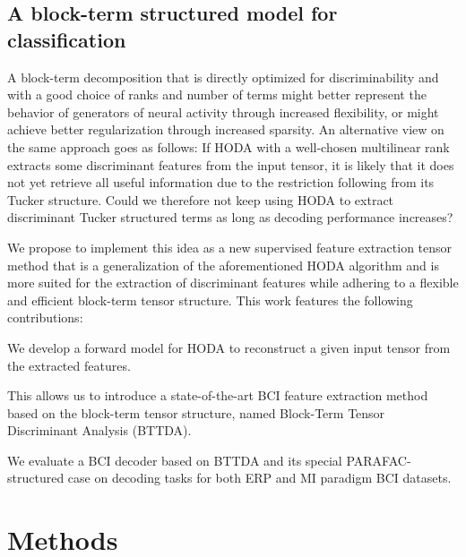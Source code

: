 \subsection{A block-term structured model for classification}

A block-term decomposition that is directly optimized for discriminability and with a
good choice of ranks and number of terms might better represent the behavior
of generators of neural activity through increased flexibility, or might
achieve better regularization through increased sparsity.
An alternative view on the same approach goes as follows:
If HODA with a well-chosen multilinear rank extracts some discriminant features
from the input tensor, it is likely that it does not yet retrieve all useful
information due to the restriction following from its Tucker structure.
Could we therefore not keep using HODA to extract discriminant Tucker structured
terms as long as decoding performance increases?

We propose to implement this idea as a new supervised feature
extraction tensor method that is a generalization of the aforementioned HODA
algorithm and is more suited for the extraction of discriminant
features while adhering to a flexible and efficient block-term tensor
structure.
This work features the following contributions:
\begin{enumerate*}[label={\arabic*)}]
	\item  We develop a forward model for HODA to reconstruct a
	      given input tensor from the extracted features.
	\item This allows us to introduce a state-of-the-art BCI feature extraction
        method based on the block-term tensor structure, named Block-Term Tensor Discriminant Analysis
	      (BTTDA).
  \item We evaluate a BCI decoder based on BTTDA and its special
	      PARAFAC-structured case on decoding tasks for both ERP and MI
	      paradigm BCI datasets.
\end{enumerate*}


\section{Methods}

